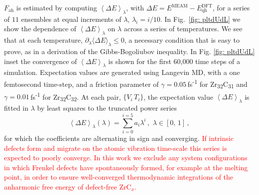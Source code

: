 \documentclass[twocolumn,american,aps,prb,showpacs,showkeys,amsmath,amssymb,superscriptaddress,a4]{revtex4-1}
\begin{document}
$F_{\text{ah}}$ is estimated by computing $\left\langle \Delta E\right\rangle _{\lambda}$, with $\Delta E= E^\text{MEAM} - E^\text{DFT}_\text{qh}$,
for a series of $11$ ensembles at equal increments of $\lambda$,  $ \lambda_{i}=i/10$.
In Fig.~\ref{fig: pltdUdL} we show the dependence of $\left\langle \Delta E\right\rangle _{\lambda}$
on $\lambda$ across a series of temperatures.
We see that at each temperature, $\partial_{\lambda}\langle\Delta E\rangle_\lambda \le 0$, a necessary condition that  is easy to prove, as in a derivation of the Gibbs-Bogoliubov inequality.
In Fig. \ref{fig: pltdUdL} inset the convergence
of $\left\langle \Delta E\right\rangle _{\lambda}$ is shown for the
first 60,000 time steps of a simulation. Expectation values are generated
using Langevin MD, with a one femtosecond time-step,\cite{Duff2015}
and a friction parameter of $\gamma=0.05$\,fs\textsuperscript{-1}
for Zr\textsubscript{32}C\textsubscript{31} and $\gamma=0.01$\,fs\textsuperscript{-1}
for Zr\textsubscript{32}C\textsubscript{32}\@. At each pair, $\{V_{i}\,T_{i}\}$,
the expectation value $\left\langle \Delta E\right\rangle _{\lambda}$
is fitted in $\lambda$ by least squares to the truncated power series
\begin{equation}
\left\langle \Delta E\right\rangle _{\lambda}(\lambda)=\sum_{i=0}^{i=5}a_{i}\lambda^{i}\,,\,\,\lambda\in[0,\,1]\,,
\label{eq: deltaUexpectation}
\end{equation}
for which the coefficients are alternating in sign and converging.  \textcolor{red}{If intrinsic defects form and migrate on the atomic vibration time-scale this series is expected to poorly converge. In this work we exclude any system configurations in which Frenkel defects have spontaneously formed, for example at the melting point, in order to ensure well-converged thermodynamic integrations of the anharmonic free energy of defect-free ZrC$_x$.}
\end{document}
